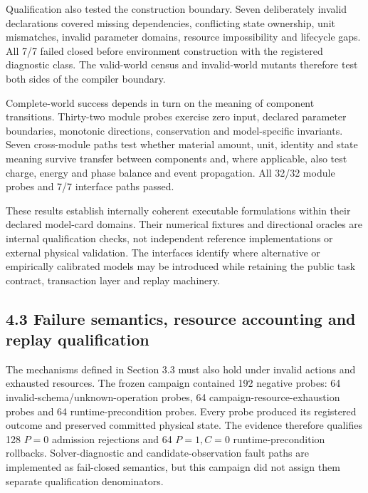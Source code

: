 \documentclass[10pt,twocolumn]{article}
\begin{document}
Qualification also tested the construction boundary. Seven deliberately
invalid declarations covered missing dependencies, conflicting state
ownership, unit mismatches, invalid parameter domains, resource
impossibility and lifecycle gaps. All 7/7 failed closed before
environment construction with the registered diagnostic class. The
valid-world census and invalid-world mutants therefore test both sides
of the compiler boundary.

Complete-world success depends in turn on the meaning of component
transitions. Thirty-two module probes exercise zero input, declared
parameter boundaries, monotonic directions, conservation and
model-specific invariants. Seven cross-module paths test whether
material amount, unit, identity and state meaning survive transfer
between components and, where applicable, also test charge, energy and
phase balance and event propagation. All 32/32 module probes and 7/7
interface paths passed.

These results establish internally coherent executable formulations
within their declared model-card domains. Their numerical fixtures and
directional oracles are internal qualification checks, not independent
reference implementations or external physical validation. The
interfaces identify where alternative or empirically calibrated models
may be introduced while retaining the public task contract, transaction
layer and replay machinery.

\subsection{4.3 Failure semantics, resource accounting and replay
qualification}\label{failure-semantics-resource-accounting-and-replay-qualification}

The mechanisms defined in Section 3.3 must also hold under invalid
actions and exhausted resources. The frozen campaign contained 192
negative probes: 64 invalid-schema/unknown-operation probes, 64
campaign-resource-exhaustion probes and 64 runtime-precondition probes.
Every probe produced its registered outcome and preserved committed
physical state. The evidence therefore qualifies 128 \(P=0\) admission
rejections and 64 \(P=1,C=0\) runtime-precondition rollbacks.
Solver-diagnostic and candidate-observation fault paths are implemented
as fail-closed semantics, but this campaign did not assign them separate
qualification denominators.
\end{document}
